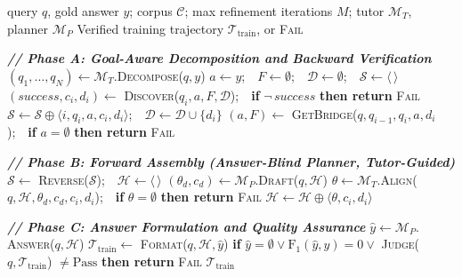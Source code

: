 \documentclass{llmxive}
\providecommand{\ourmethod}{\texttt{GrepSeek}\xspace}
\begin{document}
\begin{algorithm*}[!t]
\caption{Cold-start Trajectory Generation for \ourmethod{}}
\label{alg:coldstart}
\begin{algorithmic}[1]
\Require query $q$, gold answer $y$; corpus $\mathcal{C}$; max refinement iterations $M$; tutor $\mathcal{M}_{T}$, planner $\mathcal{M}_{P}$
\Ensure  Verified training trajectory $\mathcal{T}_{\mathrm{train}}$, or \textsc{Fail}

\Statex \textbf{\textit{// Phase A: Goal-Aware Decomposition and Backward Verification}}
\State $(q_1,\dots,q_N) \gets \mathcal{M}_{T}.$\textsc{Decompose}($q, y$)  \label{line:decompose}
\State $a \gets y$;\ \ $F \gets \emptyset$;\ \ $\mathcal{D} \gets \emptyset$;\ \ $\mathcal{S} \gets \langle \, \rangle$  \label{line:init_vars}
 \label{line:backward_loop}
    \State $(\textit{success}, c_i, d_i) \gets$ \textsc{Discover}($q_i, a, F, \mathcal{D}$);\ \ \textbf{if} $\neg\,\textit{success}$ \textbf{then return} \textsc{Fail} \label{line:discover}
    \State $\mathcal{S} \gets \mathcal{S} \oplus \langle i, q_i, a, c_i, d_i \rangle$;\ \ $\mathcal{D} \gets \mathcal{D} \cup \{d_i\}$ \label{line:record_step}
     \label{line:if_bridge}
        \State $(a, F) \gets$ \textsc{GetBridge}($q, q_{i-1}, q_i, a, d_i$);\ \ \textbf{if} $a = \emptyset$ \textbf{then return} \textsc{Fail} \label{line:bridge}
    \EndIf
\EndFor

\Statex \textbf{\textit{// Phase B: Forward Assembly (Answer-Blind Planner, Tutor-Guided)}}
\State $\mathcal{S} \gets$ \textsc{Reverse}($\mathcal{S}$);\ \ $\mathcal{H} \gets \langle \, \rangle$  \label{line:reverse_init}
 \label{line:forward_loop}
    \State $(\theta_d, c_d) \gets \mathcal{M}_{P}.$\textsc{Draft}($q, \mathcal{H}$)  \label{line:draft}
    \State $\theta \gets \mathcal{M}_{T}.$\textsc{Align}($q, \mathcal{H}, \theta_d, c_d, c_i, d_i$);\ \ \textbf{if} $\theta = \emptyset$ \textbf{then return} \textsc{Fail} \label{line:align}
    \State $\mathcal{H} \gets \mathcal{H} \oplus \langle \theta, c_i, d_i \rangle$  \label{line:append_h}
\EndFor

\Statex \textbf{\textit{// Phase C: Answer Formulation and Quality Assurance}}
\State $\hat{y} \gets \mathcal{M}_{P}.$\textsc{Answer}($q, \mathcal{H}$) \label{line:answer}
\State $\mathcal{T}_{\mathrm{train}} \gets$ \textsc{Format}($q, \mathcal{H}, \hat{y}$) \label{line:format}
\State \textbf{if} $\hat{y} = \emptyset \lor \mathrm{F_1}(\hat{y}, y) = 0 \lor$ \textsc{Judge}($q, \mathcal{T}_{\mathrm{train}}$) $\neq \mathrm{Pass}$ \textbf{then return} \textsc{Fail} \label{line:judge_gate}
\State \Return $\mathcal{T}_{\mathrm{train}}$ \label{line:return_success}


\end{algorithmic}
\end{algorithm*}
\end{document}
